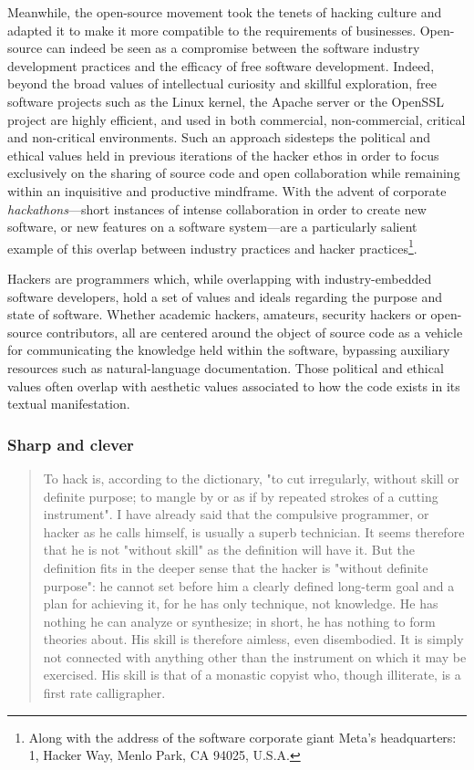 Meanwhile, the open-source movement took the tenets of hacking culture and adapted it to make it more compatible to the requirements of businesses. Open-source can indeed be seen as a compromise between the software industry development practices and the efficacy of free software development. Indeed, beyond the broad values of intellectual curiosity and skillful exploration, free software projects such as the Linux kernel, the Apache server or the OpenSSL project are highly efficient, and used in both commercial, non-commercial, critical and non-critical environments\cite{raymond_cathedral_2001}. Such an approach sidesteps the political and ethical values held in previous iterations of the hacker ethos in order to focus exclusively on the sharing of source code and open collaboration while remaining within an inquisitive and productive mindframe. With the advent of corporate \emph{hackathons}—short instances of intense collaboration in order to create new software, or new features on a software system—are a particularly salient example of this overlap between industry practices and hacker practices\cite{nolte_you_2018}\footnote{Along with the address of the software corporate giant Meta's headquarters: 1, Hacker Way, Menlo Park, CA 94025, U.S.A.}.

\vspace*{1\baselineskip}

Hackers are programmers which, while overlapping with industry-embedded software developers, hold a set of values and ideals regarding the purpose and state of software. Whether academic hackers, amateurs, security hackers or open-source contributors, all are centered around the object of source code as a vehicle for communicating the knowledge held within the software, bypassing auxiliary resources such as natural-language documentation. Those political and ethical values often overlap with aesthetic values associated to how the code exists in its textual manifestation.

\subsubsection{Sharp and clever}

\begin{quote}
    To hack is, according to the dictionary, "to cut irregularly, without skill or definite purpose; to mangle by or as if by repeated strokes of a cutting instrument". I have already said that the compulsive programmer, or hacker as he calls himself, is usually a superb technician. It seems therefore that he is not "without skill" as the definition will have it. But the definition fits in the deeper sense that the hacker is "without definite purpose": he cannot set before him a clearly defined long-term goal and a plan for achieving it, for he has only technique, not knowledge. He has nothing he can analyze or synthesize; in short, he has nothing to form theories about. His skill is therefore aimless, even disembodied. It is simply not connected with anything other than the instrument on which it may be exercised. His skill is that of a monastic copyist who, though illiterate, is a first rate calligrapher.\cite{weizenbaum_computer_1976}
\end{quote}
  

